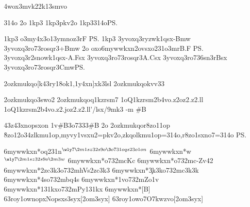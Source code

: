 \nym4wox3mvk22{k13smvo}

\spWW\WW314o
\WWpkv2o
\spn1kp3
\n1kp3pkv2o \spWW\n1kp3314o\ps

\spn1kp3  %
\2o3my4x3o1{3ymnoz3r}{F}
\ps
%
\spn1kp3
 \knn3yvoxq3r{\3yzwk1qsx}{-Bmw}
 \knn3yvoxq3r{\3o73rosqr3}{+Bmw}
\ov2o%
 \1oxo6mywwkxn{\lk2ovsxo231o3mr}{B.F}
\ps
\knn3yvoxq3r{\ynn2snowk1qsx}{-A.Fsx}
\knn3yvoxq3r{\3o73rosqr3}{A.Csx}
\knn3yvoxq3r{\3o736sn3r}{Bsx}
\spWW\knn3yvoxq3r{\3o73rosqr3}{Cmw}\ps

\42ozkmukqo[k43ry18ok1,1y4xn]{xk3lsl}
\42ozkmukqo{kvv33}

\42ozkmukqo{3swo2}
\42ozkmukqo{q1kzrsm7}
\Nomvk1oQ1kzrsm2b4vo{.z2}{oz2}{.z2.ll}{}
\Nomvk1oQ1kzrsm2b4vo{.z2.j}{oz2}{.z2.ll}{'/lsx/9mk3 -m #B}

\znpy43z43\4xnopsxon
  \nop\41v#B{\23o7333{#B}} %
\ov2o
  \42ozkmukqo{r8zo11op}
  \r8zo12o34z{lkmu1op,myvy1vsxu2=pkv2o,zkqolkmu1op=314o,r8zo1sxno7=314o}
\ps

\xo6mywwkxn*{\1oq231n}{$^{\wly7{\2m1sz32s9o{\3o731oqs23o1on}}}$}
\xo6mywwkxn*{\3w}{$^{\wly7{\2m1sz32s9o\2m 3w}}$}
\xo6mywwkxn*{\cKc}{\3o732m{cKc}}
\xo6mywwkxn*{}{\3o732m{c-Zv42}}
\xo6mywwkxn*{\hVs2zc3k3}{\3o732m{hVs2zc3k3}}
\xo6mywwkxn*{\c3k3k}{\3o732m{c3k3k}}
\xo6mywwkxn*{\bq4s}{\3o732m{bq4s}}
\xo6mywwkxn*{\Zo1v}{\3o732m{Zo1v}}
\xo6mywwkxn*{\Py131kx}{\3o732m{Py131kx}}
\xo6mywwkxn*{}[B]{}
\xo63roy1ow{nopx}{Nopsxs3syx}[2om3syx]
\xo63roy1ow{o7}{O7kwzvo}[2om3syx]

